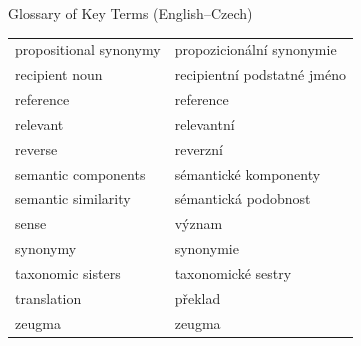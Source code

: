 \begin{frame}[allowframebreaks]{Glossary of Key Terms (English--Czech)}
\begin{longtable}{ll}
propositional synonymy & propozicionální synonymie \\
recipient noun & recipientní podstatné jméno \\
reference & reference \\
relevant & relevantní \\
reverse & reverzní \\
semantic components & sémantické komponenty \\
semantic similarity & sémantická podobnost \\
sense & význam \\
synonymy & synonymie \\
taxonomic sisters & taxonomické sestry \\
translation & překlad \\
zeugma & zeugma \\
\end{longtable}

\end{frame}
